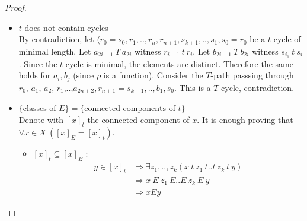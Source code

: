 \documentclass[a4paper,12pt]{article}
\theoremstyle{plain}
\theoremstyle{definition}
\theoremstyle{remark}
\begin{document}
\begin{proof}
\begin{itemize}
			Before expanding the last part it is useful introducing the following notation:
			given $\vec{l} \in \omega^{< \omega}$, define
			\[
				\langle x, g_{\vec{l}} \cdot x \rangle :=
				\begin{cases}
					\langle x \rangle & \text{ if length}(\vec{l}) = 0 \\
					\langle x, g_{\vec{l} \restriction \text{length}(\vec{l}-1)} \cdot x \rangle \frown 
					\langle (\prod_{i \leq \text{length}(\vec{l})} g_{\text{length}(\vec{l}) -i}) \cdot x \rangle & \text{ else }
				\end{cases}
			\]

			Now $\text{min}(PATH_{x,[y]_E})$ ends in $z$ can be expressed as:
			\begin{align*}
				\exists n< \omega 
				\exists \vec{i} \in \omega^{n}
				\bigg(
				& (\langle x, g_{\vec{i}} \rangle \text{ is }T \text{-path ending in }z) 
				\land \\
				& (\forall k<n \forall \vec{j} \in \omega^{k} 
					\langle x, g_{\vec{j}} \cdot x \rangle(k) \in [y]_E \to 
					\langle x, g_{\vec{j}} \cdot x \rangle \text{ is not }T\text{-path})
				\land \\
				& (\forall \vec{l} \in \omega^{n}
					\langle x, g_{\vec{j}} \cdot x \rangle(k) \in [y]_E \to
					\langle x, g_{\vec{i}} \cdot x \rangle \leq_{x,[y]_E} \langle x, g_{\vec{l}} \cdot x\rangle
				)
				\bigg)
			\end{align*}

		\item $t$ does not contain cycles \\
			By contradiction, let $\langle r_0 = s_0, r_1,..,r_n,r_{n+1},s_{k+1},..,s_1,s_0 = r_0$ be a $t$-cycle of minimal length.
			Let $a_{2i-1} \ T \ a_{2i}$ witness $r_{i-1} \ t \ r_{i}$.
			Let $b_{2i-1} \ T \ b_{2i}$ witness $s_{i_1} \ t \ s_i$.
			Since the $t$-cycle is minimal, the elements are distinct. Therefore the same holds for $a_i,b_j$ (since $\rho$ is a function).
			Consider the $T$-path passsing through $r_0$, $a_1$, $a_2$, $r_1$,..,$a_{2n +2}, r_{n+1} = s_{k+1},..,b_1,s_0$.
			This is a $T$-cycle, contradiction.
		\item $\{\text{classes of } E \} = \{\text{connected components of } t\}$ \\
			Denote with $[x]_t$ the connected component of $x$. It is enough proving that $\forall x \in X \ ([x]_E = [x]_t)$. 
			\begin{itemize}
				\item $[x]_t \subseteq [x]_E$ : \\
					\begin{align*}
						y \in [x]_t & \Rightarrow \exists z_1,..,z_k (x \ t \ z_1 \ t .. t \ z_k \ t \ y) \\
							& \Rightarrow x \ E \ z_1 \ E .. E \ z_k \ E \ y \\
							& \Rightarrow x E y
					\end{align*}


\end{itemize}
\end{itemize}
\end{proof}
\end{document}

